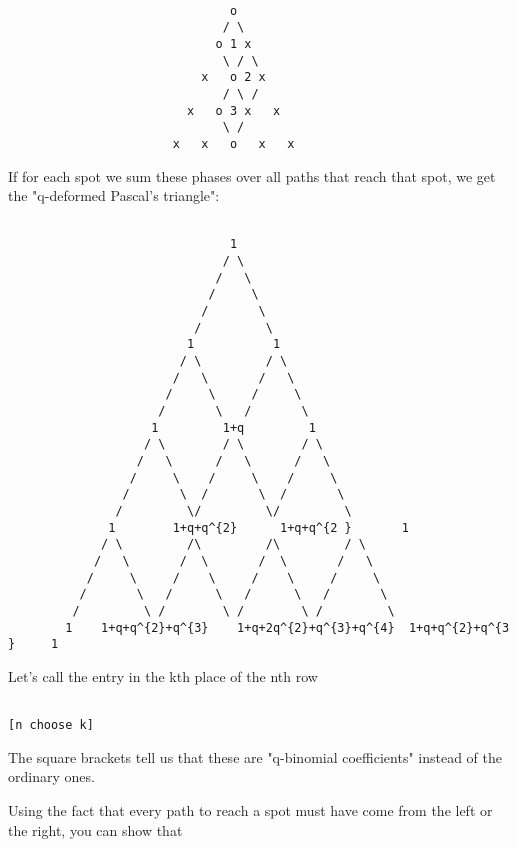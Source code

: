 \begin{verbatim}

                               o
                              / \
                             o 1 x
                              \ / \
                           x   o 2 x
                              / \ / 
                         x   o 3 x   x
                              \ /
                       x   x   o   x   x
\end{verbatim}
    
If for each spot we sum these phases over all paths that reach
that spot, we get the "q-deformed Pascal's triangle":


\begin{verbatim}

                               1
                              / \
                             /   \
                            /     \
                           /       \
                          /         \
                         1           1
                        / \         / \
                       /   \       /   \
                      /     \     /     \
                     /       \   /       \                
                    1         1+q         1
                   / \        / \        / \
                  /   \      /   \      /   \
                 /     \    /     \    /     \
                /       \  /       \  /       \
               /         \/         \/         \
              1        1+q+q^{2}      1+q+q^{2 }       1
             / \         /\         /\         / \
            /   \       /  \       /  \       /   \
           /     \     /    \     /    \     /     \
          /       \   /      \   /      \   /       \
         /         \ /        \ /        \ /         \
        1    1+q+q^{2}+q^{3}    1+q+2q^{2}+q^{3}+q^{4}  1+q+q^{2}+q^{3 }     1

\end{verbatim}
    
Let's call the entry in the kth place of the nth row 


\begin{verbatim}

[n choose k]
\end{verbatim}
    
The square brackets tell us that these are "q-binomial coefficients"
instead of the ordinary ones.

Using the fact that every path to reach a spot must have come 
from the left or the right, you can show that


